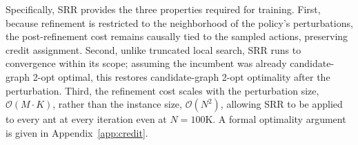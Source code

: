 \documentclass[sigconf]{acmart}
\begin{document}
Specifically, SRR provides the three properties required for training. First, because refinement is restricted to the neighborhood of the policy's perturbations, the post-refinement cost remains causally tied to the sampled actions, preserving credit assignment. Second, unlike truncated local search, SRR runs to convergence within its scope; assuming the incumbent was already candidate-graph 2-opt optimal, this restores candidate-graph 2-opt optimality after the perturbation. Third, the refinement cost scales with the perturbation size, $\mathcal{O}(M \cdot K)$, rather than the instance size, $\mathcal{O}(N^2)$, allowing SRR to be applied to every ant at every iteration even at $N{=}100$K. A formal optimality argument is given in Appendix~\ref{app:credit}.


\end{document}

